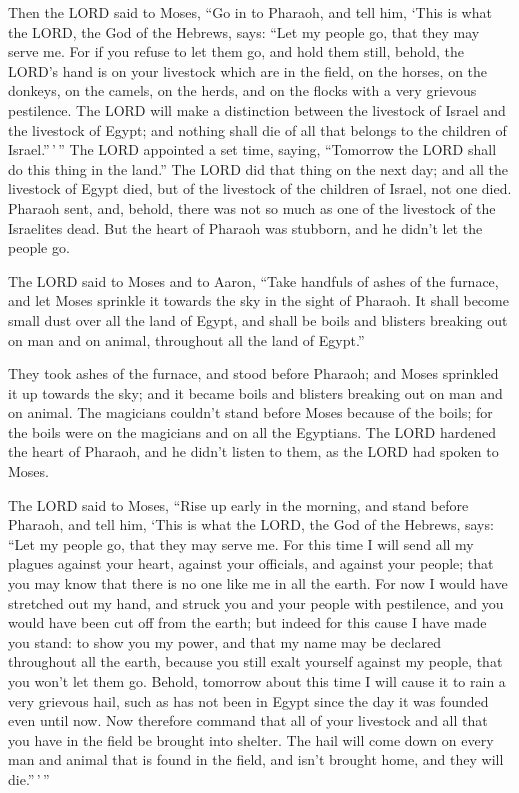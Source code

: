  Then the LORD said to Moses, ``Go in to Pharaoh, and tell
him, `This is what the LORD, the God of the Hebrews, says: ``Let my
people go, that they may serve me.  For if you refuse to
let them go, and hold them still,  behold, the LORD's hand
is on your livestock which are in the field, on the horses, on the
donkeys, on the camels, on the herds, and on the flocks with a very
grievous pestilence.  The LORD will make a distinction
between the livestock of Israel and the livestock of Egypt; and nothing
shall die of all that belongs to the children of Israel.''\,'\,''
 The LORD appointed a set time, saying, ``Tomorrow the
LORD shall do this thing in the land.''  The LORD did that
thing on the next day; and all the livestock of Egypt died, but of the
livestock of the children of Israel, not one died. 
Pharaoh sent, and, behold, there was not so much as one of the livestock
of the Israelites dead. But the heart of Pharaoh was stubborn, and he
didn't let the people go.

 The LORD said to Moses and to Aaron, ``Take handfuls of
ashes of the furnace, and let Moses sprinkle it towards the sky in the
sight of Pharaoh.  It shall become small dust over all the
land of Egypt, and shall be boils and blisters breaking out on man and
on animal, throughout all the land of Egypt.''

 They took ashes of the furnace, and stood before
Pharaoh; and Moses sprinkled it up towards the sky; and it became boils
and blisters breaking out on man and on animal.  The
magicians couldn't stand before Moses because of the boils; for the
boils were on the magicians and on all the Egyptians. 
The LORD hardened the heart of Pharaoh, and he didn't listen to them, as
the LORD had spoken to Moses.

 The LORD said to Moses, ``Rise up early in the morning,
and stand before Pharaoh, and tell him, `This is what the LORD, the God
of the Hebrews, says: ``Let my people go, that they may serve me.
 For this time I will send all my plagues against your
heart, against your officials, and against your people; that you may
know that there is no one like me in all the earth.  For
now I would have stretched out my hand, and struck you and your people
with pestilence, and you would have been cut off from the earth;
 but indeed for this cause I have made you stand: to show
you my power, and that my name may be declared throughout all the earth,
 because you still exalt yourself against my people, that
you won't let them go.  Behold, tomorrow about this time
I will cause it to rain a very grievous hail, such as has not been in
Egypt since the day it was founded even until now.  Now
therefore command that all of your livestock and all that you have in
the field be brought into shelter. The hail will come down on every man
and animal that is found in the field, and isn't brought home, and they
will die.''\,'\,''

